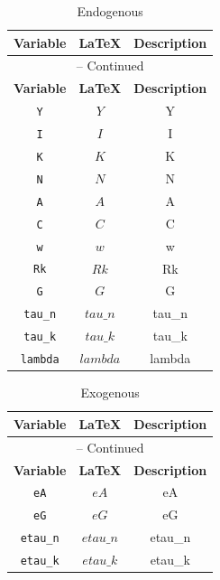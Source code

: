 \begin{center}
\begin{longtable}{ccc}
\caption{Endogenous}\\%
\hline%
\multicolumn{1}{c}{\textbf{Variable}} &
\multicolumn{1}{c}{\textbf{\LaTeX}} &
\multicolumn{1}{c}{\textbf{Description}}\\%
\hline\hline%
\endfirsthead
\multicolumn{3}{c}{{\tablename} \thetable{} -- Continued}\\%
\hline%
\multicolumn{1}{c}{\textbf{Variable}} &
\multicolumn{1}{c}{\textbf{\LaTeX}} &
\multicolumn{1}{c}{\textbf{Description}}\\%
\hline\hline%
\endhead
\texttt{Y} & $Y$ & Y\\
\texttt{I} & $I$ & I\\
\texttt{K} & $K$ & K\\
\texttt{N} & $N$ & N\\
\texttt{A} & $A$ & A\\
\texttt{C} & $C$ & C\\
\texttt{w} & $w$ & w\\
\texttt{Rk} & $Rk$ & Rk\\
\texttt{G} & $G$ & G\\
\texttt{tau\_n} & $tau\_n$ & tau\_n\\
\texttt{tau\_k} & $tau\_k$ & tau\_k\\
\texttt{lambda} & $lambda$ & lambda\\
\hline%
\end{longtable}
\end{center}
\begin{center}
\begin{longtable}{ccc}
\caption{Exogenous}\\%
\hline%
\multicolumn{1}{c}{\textbf{Variable}} &
\multicolumn{1}{c}{\textbf{\LaTeX}} &
\multicolumn{1}{c}{\textbf{Description}}\\%
\hline\hline%
\endfirsthead
\multicolumn{3}{c}{{\tablename} \thetable{} -- Continued}\\%
\hline%
\multicolumn{1}{c}{\textbf{Variable}} &
\multicolumn{1}{c}{\textbf{\LaTeX}} &
\multicolumn{1}{c}{\textbf{Description}}\\%
\hline\hline%
\endhead
\texttt{eA} & $eA$ & eA\\
\texttt{eG} & $eG$ & eG\\
\texttt{etau\_n} & $etau\_n$ & etau\_n\\
\texttt{etau\_k} & $etau\_k$ & etau\_k\\
\hline%
\end{longtable}
\end{center}
